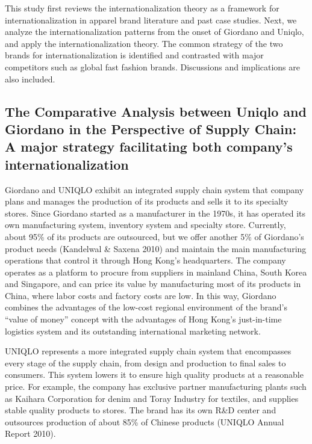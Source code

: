 \documentclass[12pt,a4paper]{article}
\begin{document}
This study first reviews the internationalization theory as a framework
for internationalization in apparel brand literature and past case
studies. Next, we analyze the internationalization patterns from the
onset of Giordano and Uniqlo, and apply the internationalization theory.
The common strategy of the two brands for internationalization is
identified and contrasted with major competitors such as global fast
fashion brands. Discussions and implications are also included.

\hypertarget{the-comparative-analysis-between-uniqlo-and-giordano-in-the-perspective-of-supply-chain-a-major-strategy-facilitating-both-companys-internationalization}{%
\subsection{The Comparative Analysis between Uniqlo and Giordano in the
Perspective of Supply Chain: A major strategy facilitating both
company's
internationalization}\label{the-comparative-analysis-between-uniqlo-and-giordano-in-the-perspective-of-supply-chain-a-major-strategy-facilitating-both-companys-internationalization}}

Giordano and UNIQLO exhibit an integrated supply chain system that
company plans and manages the production of its products and sells it to
its specialty stores. Since Giordano started as a manufacturer in the
1970s, it has operated its own manufacturing system, inventory system
and specialty store. Currently, about 95\% of its products are
outsourced, but we offer another 5\% of Giordano's product needs
(Kandelwal \& Saxena 2010) and maintain the main manufacturing
operations that control it through Hong Kong's headquarters. The company
operates as a platform to procure from suppliers in mainland China,
South Korea and Singapore, and can price its value by manufacturing most
of its products in China, where labor costs and factory costs are low.
In this way, Giordano combines the advantages of the low-cost regional
environment of the brand's ``value of money'' concept with the
advantages of Hong Kong's just-in-time logistics system and its
outstanding international marketing network.

UNIQLO represents a more integrated supply chain system that encompasses
every stage of the supply chain, from design and production to final
sales to consumers. This system lowers it to ensure high quality
products at a reasonable price. For example, the company has exclusive
partner manufacturing plants such as Kaihara Corporation for denim and
Toray Industry for textiles, and supplies stable quality products to
stores. The brand has its own R\&D center and outsources production of
about 85\% of Chinese products (UNIQLO Annual Report 2010).
\end{document}
